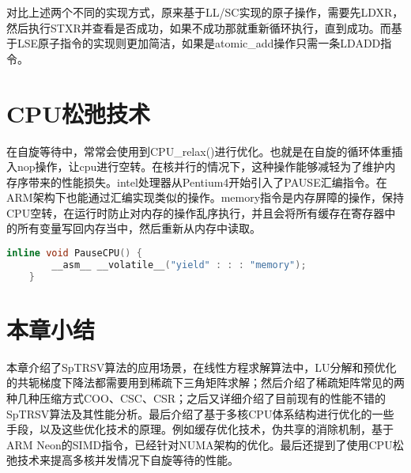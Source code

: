 对比上述两个不同的实现方式，原来基于LL/SC实现的原子操作，需要先LDXR，然后执行STXR并查看是否成功，如果不成功那就重新循环执行，直到成功。而基于LSE原子指令的实现则更加简洁，如果是atomic\_add操作只需一条LDADD指令。

\section{CPU松弛技术}

在自旋等待中，常常会使用到CPU\_relax()进行优化。也就是在自旋的循环体重插入nop操作，让cpu进行空转。在核并行的情况下，这种操作能够减轻为了维护内存序带来的性能损失。intel处理器从Pentium4开始引入了PAUSE汇编指令。在ARM架构下也能通过汇编实现类似的操作。memory指令是内存屏障的操作，保持CPU空转，在运行时防止对内存的操作乱序执行，并且会将所有缓存在寄存器中的所有变量写回内存当中，然后重新从内存中读取。


\begin{lstlisting}[language=c++]
    inline void PauseCPU() { 
        __asm__ __volatile__("yield" : : : "memory"); 
    }
\end{lstlisting}

\section{本章小结}

本章介绍了SpTRSV算法的应用场景，在线性方程求解算法中，LU分解和预优化的共轭梯度下降法都需要用到稀疏下三角矩阵求解；然后介绍了稀疏矩阵常见的两种几种压缩方式COO、CSC、CSR；之后又详细介绍了目前现有的性能不错的SpTRSV算法及其性能分析。最后介绍了基于多核CPU体系结构进行优化的一些手段，以及这些优化技术的原理。例如缓存优化技术，伪共享的消除机制，基于ARM Neon的SIMD指令，已经针对NUMA架构的优化。最后还提到了使用CPU松弛技术来提高多核并发情况下自旋等待的性能。




\endinput